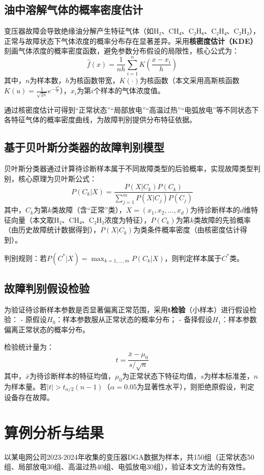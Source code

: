 \documentclass[12pt,a4paper]{article}
\begin{document}
\subsection{油中溶解气体的概率密度估计}
变压器故障会导致绝缘油分解产生特征气体（如H₂、CH₄、C₂H₆、C₂H₄、C₂H₂），正常与故障状态下气体浓度的概率分布存在显著差异。采用\textbf{核密度估计（KDE）}刻画气体浓度的概率密度函数，避免参数分布假设的局限性，核心公式为：
\[
\hat{f}(x) = \frac{1}{n h} \sum_{i=1}^n K\left( \frac{x - x_i}{h} \right)
\]
其中，$n$为样本数，$h$为核函数带宽，$K(\cdot)$为核函数（本文采用高斯核函数$K(u) = \frac{1}{\sqrt{2\pi}}e^{-\frac{u^2}{2}}$），$x_i$为第$i$个样本的气体浓度值。

通过核密度估计可得到“正常状态”“局部放电”“高温过热”“电弧放电”等不同状态下各特征气体的概率密度曲线，为故障判别提供分布特征依据。

\subsection{基于贝叶斯分类器的故障判别模型}
贝叶斯分类器通过计算待诊断样本属于不同故障类型的后验概率，实现故障类型判别，核心原理为贝叶斯公式：
\[
P(C_k | X) = \frac{P(X | C_k) P(C_k)}{\sum_{j=1}^m P(X | C_j) P(C_j)}
\]
其中，$C_k$为第$k$类故障（含“正常”类），$X = (x_1, x_2, ..., x_d)$为待诊断样本的$d$维特征向量（本文取H₂、CH₄、C₂H₂浓度为特征），$P(C_k)$为第$k$类故障的先验概率（由历史故障统计数据得到），$P(X | C_k)$为类条件概率密度（由核密度估计得到）。

判别规则：若$P(C^* | X) = \max_{k=1,...,m} P(C_k | X)$，则判定样本属于$C^*$类。

\subsection{故障判别假设检验}
为验证待诊断样本参数是否显著偏离正常范围，采用\textbf{t检验}（小样本）进行假设检验：
- 原假设$H_0$：样本参数服从正常状态的概率分布；
- 备择假设$H_1$：样本参数偏离正常状态的概率分布。

检验统计量为：
\[
t = \frac{\bar{x} - \mu_0}{s / \sqrt{n}}
\]
其中，$\bar{x}$为待诊断样本的特征均值，$\mu_0$为正常状态下特征均值，$s$为样本标准差，$n$为样本量。若$|t| > t_{\alpha/2}(n-1)$（$\alpha=0.05$为显著性水平），则拒绝原假设，判定设备存在故障。

\section{算例分析与结果}
以某电网公司2023-2024年收集的变压器DGA数据为样本，共150组（正常状态50组、局部放电30组、高温过热40组、电弧放电30组），验证本文方法的有效性。
\end{document}

